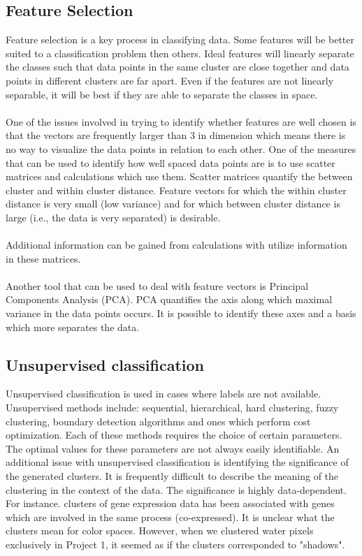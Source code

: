 \documentclass[12pt]{article}
\begin{document}
\subsection{Feature Selection}
Feature selection is a key process in classifying data. Some features will be better suited to a classification problem then others. Ideal features will linearly separate the classes such that data points in the same cluster are close together and data points in different clusters are far apart. Even if the features are not linearly separable, it will be best if they are able to separate the classes in space.\\
\\
One of the issues involved in trying to identify whether features are well chosen is that the vectors are frequently larger than 3 in dimension which means there is no way to visualize the data points in relation to each other. One of the measures that can be used to identify how well spaced data points are is to use scatter matrices and calculations which use them. Scatter matrices quantify the between cluster and within cluster distance. Feature vectors for which the within cluster distance is very small (low variance) and for which between cluster distance is large (i.e., the data is very separated) is desirable. \\
\\
Additional information can be gained from calculations with utilize information in these matrices. \\
\\
Another tool that can be used to deal with feature vectors is Principal Components Analysis (PCA). PCA quantifies the axis along which maximal variance in the data points occurs. It is possible to identify these axes and a basis which more separates the data. 
\subsection{Unsupervised classification}
Unsupervised classification is used in cases where labels are not available. Unsupervised methods include: sequential, hierarchical, hard clustering, fuzzy clustering, boundary detection algorithms and ones which perform cost optimization. Each of these methods requires the choice of certain parameters. The optimal values for these parameters are not always easily identifiable. An additional issue with unsupervised classification is identifying the significance of the generated clusters. It is frequently difficult to describe the meaning of the clustering in the context of the data. The significance is highly data-dependent. For instance. clusters of gene expression data has been associated with genes which are involved in the same process (co-expressed). It is unclear what the clusters mean for color spaces. However, when we clustered water pixels exclusively in Project 1, it seemed as if the clusters corresponded to "shadows".
\end{document}
